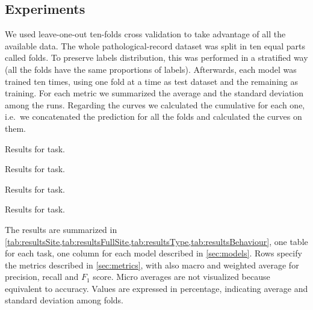 \subsection{Experiments}
\label{sec:experiments}
We used leave-one-out ten-folds cross validation
to take advantage of all the available data. The whole
pathological-record dataset was split in ten equal parts called
folds. To preserve labels distribution, this was performed in a
stratified way (all the folds have the same proportions of
labels). Afterwards, each
model was trained ten times, using one fold at a time as test
dataset and the remaining as training. For each metric we summarized the
average and the standard deviation among the runs. Regarding the
curves we calculated the cumulative for each 
one, i.e.\ we concatenated the prediction for all the folds and
calculated the curves on them. 

\begin{table}
  \centering
  \caption{Results for \site{} task.}
  \label{tab:resultsSite}
  \footnotesize
  
\end{table}

\begin{table}
  \centering
  \caption{Results for \fullSite{} task.}
  \label{tab:resultsFullSite}
  \footnotesize
  
\end{table}

\begin{table}
  \centering
  \caption{Results for \type{} task.}
  \label{tab:resultsType}
  \footnotesize
  
\end{table}

\begin{table}
  \centering
  \caption{Results for \behaviour{} task.}
  \label{tab:resultsBehaviour}
  \footnotesize
  
\end{table}

The results are summarized in
\cref{tab:resultsSite,tab:resultsFullSite,tab:resultsType,tab:resultsBehaviour},
one table for each task, one column for each 
model described in \cref{sec:models}. Rows specify the metrics
described in \cref{sec:metrics}, with also macro and weighted average
for precision, recall and $F_1$ score. Micro averages are not
visualized because equivalent to accuracy. Values are expressed in
percentage, indicating average and standard deviation among folds.

